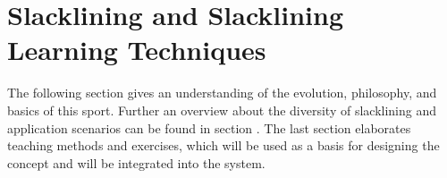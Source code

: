 \chapter{Slacklining  and Slacklining Learning Techniques}\label{3_slacklining}
The following section \textit{} gives an understanding of the evolution, philosophy, and basics of this sport. Further an overview about the diversity of slacklining and application scenarios can be found in section \textit{}. The last section \textit{} elaborates teaching methods and exercises, which will be used as a basis for designing the concept and will be integrated into the system.
 

 
 
 
 
 
  